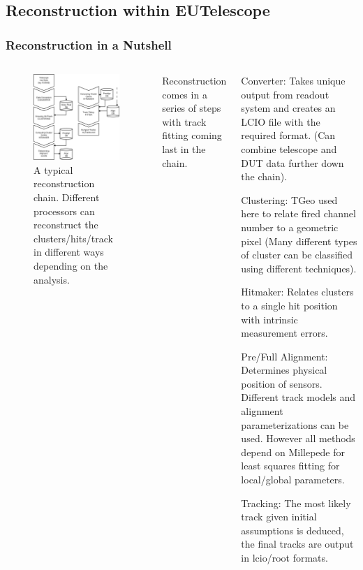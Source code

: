\documentclass{beamer}
\begin{document}
\subsection{Reconstruction within EUTelescope}
\begin{frame}
\frametitle{Reconstruction in a Nutshell}
\begin{columns}
\begin{figure}
\includegraphics[scale=0.13]{pics/EUTelFullRecoChain.pdf}
\caption{\tiny{A typical reconstruction chain. Different processors can reconstruct the clusters/hits/track in different ways depending on the analysis.}}
\end{figure}
Reconstruction comes in a series of steps with track fitting coming last in the chain. 
\begin{itemize}
\tiny{
\item Converter: Takes unique output from readout system and creates an LCIO file with the required format. (Can combine telescope and DUT data further down the chain).
\pause
\item Clustering: TGeo used here to relate fired channel number to a geometric pixel (Many different types of cluster can be classified using different techniques).
\pause
\item Hitmaker: Relates clusters to a single hit position with intrinsic measurement errors.
\pause
\item Pre/Full Alignment: Determines physical position of sensors. Different track models and alignment parameterizations can be used. However all methods depend on Millepede for least squares fitting for local/global parameters.
\pause
\item Tracking: The most likely track given initial assumptions is deduced, the final tracks are output in lcio/root formats.
}
\end{itemize}
\end{columns}
\end{frame}
\end{document}
